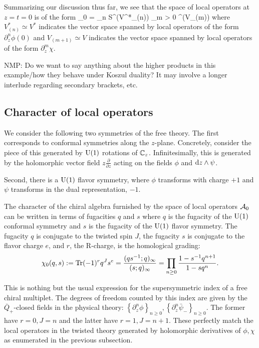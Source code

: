 \documentclass[11pt]{amsart}
\def\natalie#1{{\textcolor{green!65!black}{NMP: {#1}}}}
\begin{document}
Summarizing our discussion thus far, we see that the space of local operators at $z=t=0$ is of the form
\beqn\label{eqn:freeops}
\cA_0 = \bigotimes_{n } {\rm S}^\bu \big(V^*_{(n)}\big) \otimes \bigotimes_{m > 0} \wedge^\bu \big(V_{(m)}\big)
\eeqn
where $V_{(n)}^* \simeq V^*$ indicates the vector space spanned by local operators of the form $\partial^n_{z} \phi(0)$ and $V_{(m+1)} \simeq V$ indicates the vector space spanned by local operators of the form $\partial^{m}_z \chi$. 

\natalie{Do we want to say anything about the higher products in this example/how they behave under Koszul duality? It may involve a longer interlude regarding secondary brackets, etc.}

\subsection{Character of local operators}

We consider the following two symmetries of the free theory.
The first corresponds to conformal symmetries along the $z$-plane. 
Concretely, consider the piece of this generated by ${\rm U}(1)$ rotations of $\mathbb C_z$.
Infinitesimally, this is generated by the holomorphic vector field $z \frac{\partial}{\partial z}$ acting on the fields $\phi$ and ${\rm d} z \wedge \psi$. 

Second, there is a ${\rm U}(1)$ flavor symmetry, where $\phi$ transforms with charge $+1$ and $\psi$ transforms in the dual representation, $-1$.

The character of the chiral algebra furnished by the space of local operators $\mathcal A_0$ can be written in terms of fugacities $q$ and $s$ where $q$ is the fugacity of the ${\rm U}(1)$ conformal symmetry and $s$ is the fugacity of the ${\rm U}(1)$ flavor symmetry. The fugacity $q$ is conjugate to the twisted spin $J$, the fugacity $s$ is conjugate to the flavor charge $e$, and $r$, the R-charge, is the homological grading:
\[
\chi_0(q , s) := \operatorname{Tr} (-1)^r q^J s^e =  \frac{(q s^{-1} ; q)_\infty}{(s ; q)_\infty}  = \prod_{n \geq 0} \frac{1 - s^{-1} q^{n+1}}{1 - s q^n}.
\]

This is nothing but the usual expression for the supersymmetric index of a free chiral multiplet. The degrees of freedom counted by this index are given by the $\bar{Q}_+$-closed fields in the physical theory: $\left\lbrace \partial_z^n \phi \right\rbrace_{n \geq 0}, \left\lbrace \partial_z^n \bar{\psi}_- \right\rbrace_{n \geq 0}$. The former have $r=0, J = n$ and the latter have $r=1, J= n+1$. These perfectly match the local operators in the twisted theory generated by holomorphic derivatives of $\phi, \chi$ as enumerated in the previous subsection.
\end{document}
